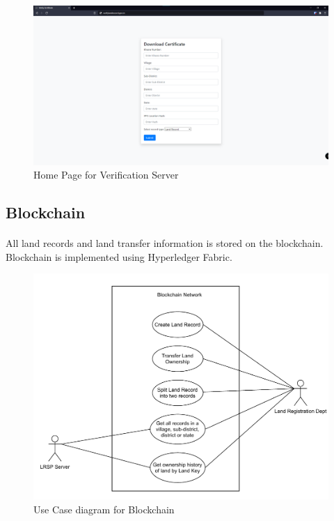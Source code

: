 \documentclass[12pt]{article}
\begin{document}
        \begin{figure}[H]
                \includegraphics[scale=0.25]{verification_home.png}
                \centering
                \caption{Home Page for Verification Server}
        \end{figure}

    \subsection{Blockchain}
        \paragraph{}
        All land records and land transfer information is stored on the blockchain. Blockchain is implemented using Hyperledger Fabric.

        \begin{figure}[htbp]
            \includegraphics[scale=0.25]{blockchain_use_cases}
            \centering
            \caption{Use Case diagram for Blockchain}
            \label{fig:bl_use_case}
        \end{figure}
\end{document}
